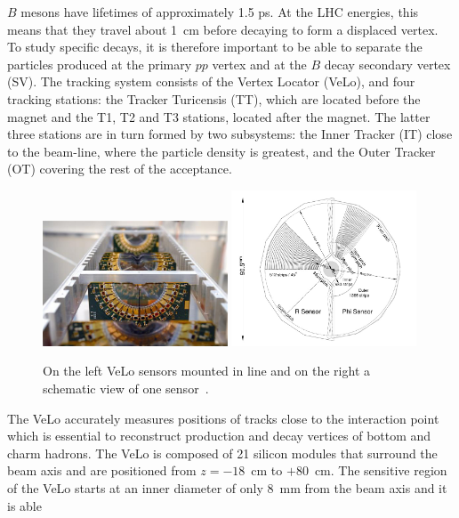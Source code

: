 $B$ mesons have lifetimes of approximately 1.5 ps. At the LHC energies, this means that they travel about
1~cm before decaying to form a displaced vertex. To study specific decays, it is therefore important
to be able to separate the particles produced at the primary $pp$ vertex and at the $B$ decay secondary vertex (SV).
The tracking system consists of the Vertex Locator (VeLo), and four tracking stations:
the Tracker Turicensis (TT), which are located before the magnet and the T1, T2 and T3 stations,
located after the magnet. The latter three stations are in turn formed by two subsystems:
the Inner Tracker (IT) close to the beam-line, where the particle density is greatest, and
the Outer Tracker (OT) covering the rest of the acceptance.
%
\begin{center}
\begin{figure}[h!]
\centering 
\includegraphics[width=0.49\textwidth]{Detector/figs/detector/VELO.png}
\includegraphics[width=0.49\textwidth]{Detector/figs/detector/VELO_scheme.png}
\caption{On the left VeLo sensors mounted in line and on the right a schematic view of one sensor~\cite{Alves:2008zz}.}
\label{VeLo}
\end{figure}
\end{center}
%
The VeLo accurately measures positions of tracks close to the interaction point which is essential to reconstruct
 production and decay vertices of bottom and charm hadrons. The VeLo is composed of 21
silicon modules that surround the beam axis and are positioned from $z = -18$~cm to $+80$~cm.
The sensitive region of the VeLo starts at an inner diameter of only 8~mm from the beam axis and it is able
